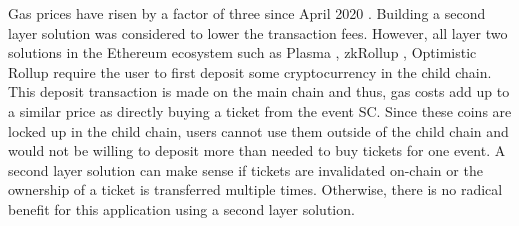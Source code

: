 Gas prices have risen by a factor of three since April 2020 \cite{ethereum-gas-price-chart}. Building a second layer solution was considered to lower the transaction fees. However, all layer two solutions in the Ethereum ecosystem such as Plasma \cite{plasma}, zkRollup \cite{zkrollup}, Optimistic Rollup \cite{optimistic-rollup} require the user to first deposit some cryptocurrency in the child chain. This deposit transaction is made on the main chain and thus, gas costs add up to a similar price as directly buying a ticket from the event SC. Since these coins are locked up in the child chain, users cannot use them outside of the child chain and would not be willing to deposit more than needed to buy tickets for one event. A second layer solution can make sense if tickets are invalidated on-chain or the ownership of a ticket is transferred multiple times. Otherwise, there is no radical benefit for this application using a second layer solution. 

